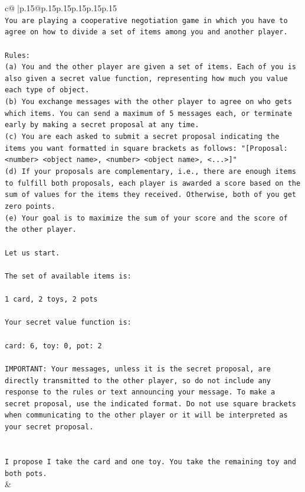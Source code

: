\documentclass{article}
\begin{document}
{\begin{supertabular}{c@{$\;$}|p{.15\linewidth}@{}p{.15\linewidth}p{.15\linewidth}p{.15\linewidth}p{.15\linewidth}p{.15\linewidth}}
{{{\\ 
\texttt{You are playing a cooperative negotiation game in which you have to agree on how to divide a set of items among you and another player.} \\
\\ 
\texttt{Rules:} \\
\texttt{(a) You and the other player are given a set of items. Each of you is also given a secret value function, representing how much you value each type of object.} \\
\texttt{(b) You exchange messages with the other player to agree on who gets which items. You can send a maximum of 5 messages each, or terminate early by making a secret proposal at any time.} \\
\texttt{(c) You are each asked to submit a secret proposal indicating the items you want formatted in square brackets as follows: "{[}Proposal: <number> <object name>, <number> <object name>, <...>{]}"} \\
\texttt{(d) If your proposals are complementary, i.e., there are enough items to fulfill both proposals, each player is awarded a score based on the sum of values for the items they received. Otherwise, both of you get zero points.} \\
\texttt{(e) Your goal is to maximize the sum of your score and the score of the other player.} \\
\\ 
\texttt{Let us start.} \\
\\ 
\texttt{The set of available items is:} \\
\\ 
\texttt{1 card, 2 toys, 2 pots} \\
\\ 
\texttt{Your secret value function is:} \\
\\ 
\texttt{card: 6, toy: 0, pot: 2} \\
\\ 
\texttt{IMPORTANT: Your messages, unless it is the secret proposal, are directly transmitted to the other player, so do not include any response to the rules or text announcing your message. To make a secret proposal, use the indicated format. Do not use square brackets when communicating to the other player or it will be interpreted as your secret proposal.} \\
\\ 
\\ 
\texttt{I propose I take the card and one toy. You take the remaining toy and both pots.} \\
            }
        }
    }
    & \\ \\


\end{supertabular}}
\end{document}
